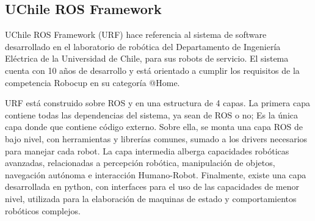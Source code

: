 %
%
%
%
%







\subsection{UChile ROS Framework}

UChile ROS Framework (URF) hace referencia al sistema de software desarrollado en el laboratorio de robótica del Departamento de Ingeniería Eléctrica de la Universidad de Chile, para sus robots de servicio. El sistema cuenta con 10 años de desarrollo y está orientado a cumplir los requisitos de la competencia Robocup en su categoría @Home.

URF está construido sobre ROS y en una estructura de 4 capas. La primera capa contiene todas las dependencias del sistema, ya sean de ROS o no; Es la única capa donde que contiene código externo. Sobre ella, se monta una capa ROS de bajo nivel, con herramientas y librerías comunes, sumado a los drivers necesarios para manejar cada robot. La capa intermedia alberga capacidades robóticas avanzadas, relacionadas a percepción robótica, manipulación de objetos, navegación autónoma e interacción Humano-Robot. Finalmente, existe una capa desarrollada en python, con interfaces para el uso de las capacidades de menor nivel, utilizada para la elaboración de maquinas de estado y comportamientos robóticos complejos.

